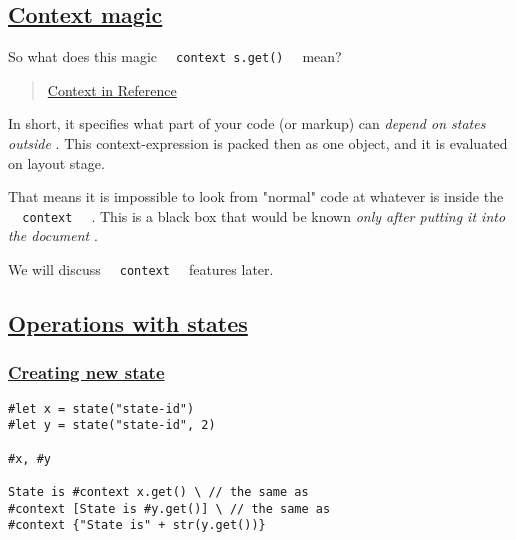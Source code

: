 \pandocbounded{}

\subsection{\texorpdfstring{\hyperref[context-magic]{Context
magic}}{Context magic}}\label{context-magic}

So what does this magic
\texttt{\ }{\texttt{\ context\ s.get()\ }}\texttt{\ } mean?

\begin{quote}
\href{https://typst.app/docs/reference/context/}{Context in Reference}
\end{quote}

In short, it specifies what part of your code (or markup) can
\emph{depend on states outside} . This context-expression is packed then
as one object, and it is evaluated on layout stage.

That means it is impossible to look from "normal" code at whatever is
inside the \texttt{\ }{\texttt{\ context\ }}\texttt{\ } . This is a
black box that would be known \emph{only after putting it into the
document} .

We will discuss \texttt{\ }{\texttt{\ context\ }}\texttt{\ } features
later.

\subsection{\texorpdfstring{\hyperref[operations-with-states]{Operations
with states}}{Operations with states}}\label{operations-with-states}

\subsubsection{\texorpdfstring{\hyperref[creating-new-state]{Creating
new state}}{Creating new state}}\label{creating-new-state}

\begin{verbatim}
#let x = state("state-id")
#let y = state("state-id", 2)

#x, #y

State is #context x.get() \ // the same as
#context [State is #y.get()] \ // the same as
#context {"State is" + str(y.get())}
\end{verbatim}

\pandocbounded{}

